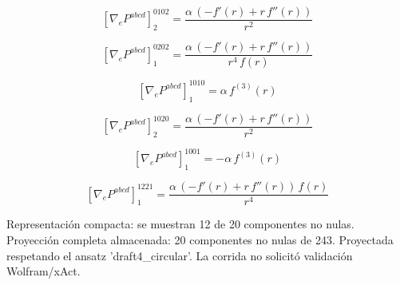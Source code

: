 \documentclass[11pt]{article}
\begin{document}
\par\smallskip
\begin{dmath*}[breakdepth={5}]
\left[\nabla_e P^{abcd}\right]_{2}^{0102} = \frac{\alpha\,\left(-f'\!\left(r\right) + r\,f''\!\left(r\right)\right)}{{r}^{2}}
\end{dmath*}
\par\smallskip
\begin{dmath*}[breakdepth={5}]
\left[\nabla_e P^{abcd}\right]_{1}^{0202} = \frac{\alpha\,\left(-f'\!\left(r\right) + r\,f''\!\left(r\right)\right)}{{r}^{4}\,f\!\left(r\right)}
\end{dmath*}
\par\smallskip
\begin{dmath*}[breakdepth={5}]
\left[\nabla_e P^{abcd}\right]_{1}^{1010} = \alpha\,f^{(3)}\!\left(r\right)
\end{dmath*}
\par\smallskip
\begin{dmath*}[breakdepth={5}]
\left[\nabla_e P^{abcd}\right]_{2}^{1020} = \frac{\alpha\,\left(-f'\!\left(r\right) + r\,f''\!\left(r\right)\right)}{{r}^{2}}
\end{dmath*}
\par\smallskip
\begin{dmath*}[breakdepth={5}]
\left[\nabla_e P^{abcd}\right]_{1}^{1001} = -\alpha\,f^{(3)}\!\left(r\right)
\end{dmath*}
\par\smallskip
\begin{dmath*}[breakdepth={5}]
\left[\nabla_e P^{abcd}\right]_{1}^{1221} = \frac{\alpha\,\left(-f'\!\left(r\right) + r\,f''\!\left(r\right)\right)\,f\!\left(r\right)}{{r}^{4}}
\end{dmath*}
\par\smallskip
Representación compacta: se muestran 12 de 20 componentes no nulas.
Proyección completa almacenada: 20 componentes no nulas de 243. Proyectada respetando el ansatz 'draft4\_circular'. La corrida no solicitó validación Wolfram/xAct.\par\medskip
{}
\end{document}
